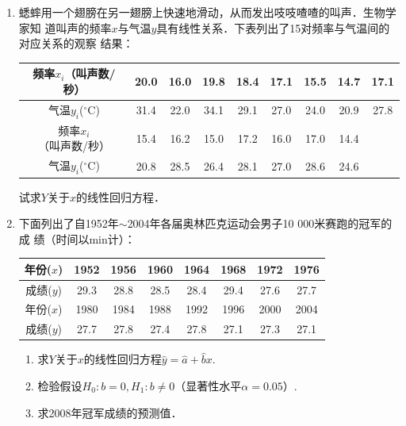 \begin{enumerate}
    \item 蟋蟀用一个翅膀在另一翅膀上快速地滑动，从而发出吱吱喳喳的叫声．生物学家知
    道叫声的频率$x$与气温$y$具有线性关系．下表列出了15对频率与气温间的对应关系的观察
    结果：
    \renewcommand{\arraystretch}{1.3}
    \begin{table}[H]\centering
        \begin{tabular}{c|cccccccc}
        \hline
        频率$x_i$（叫声数/秒） & 20.0 & 16.0 & 19.8 & 18.4 & 17.1 & 15.5 & 14.7 & 17.1 \\ \hline
        气温$y_i$($^{\circ}$C)     & 31.4 & 22.0 & 34.1 & 29.1 & 27.0 & 24.0 & 20.9 & 27.8 \\ \hline
        频率$x_i$（叫声数/秒） & 15.4 & 16.2 & 15.0 & 17.2 & 16.0 & 17.0 & 14.4 &      \\ \hline
        气温$y_i$($^{\circ}$C)     & 20.8 & 28.5 & 26.4 & 28.1 & 27.0 & 28.6 & 24.6 &      \\ \hline
        \end{tabular}
    \end{table}
    \renewcommand{\arraystretch}{1.0}
    试求$Y$关于$x$的线性回归方程．




    \item 下面列出了自1952年$\sim$2004年各届奥林匹克运动会男子10 000米赛跑的冠军的成
    绩（时间以min计）：
    \renewcommand{\arraystretch}{1.3}
    \begin{table}[H]\centering
        \begin{tabular}{c|ccccccc}
        \hline
        年份($x$) & 1952 & 1956 & 1960 & 1964 & 1968 & 1972 & 1976 \\ \hline
        成绩($y$) & 29.3 & 28.8 & 28.5 & 28.4 & 29.4 & 27.6 & 27.7 \\ \hline
        年份($x$) & 1980 & 1984 & 1988 & 1992 & 1996 & 2000 & 2004 \\ \hline
        成绩($y$) & 27.7 & 27.8 & 27.4 & 27.8 & 27.1 & 27.3 & 27.1 \\ \hline
        \end{tabular}
    \end{table}
    \renewcommand{\arraystretch}{1.0}
    \begin{enumerate}
        \item 求$Y$关于$x$的线性回归方程$\hat{y}=\hat{a}+\hat{b}x$.
        \item 检验假设$H_0:b=0,H_1:b\neq 0$（显著性水平$\alpha=0.05$）.
        \item 求2008年冠军成绩的预测值．
    \end{enumerate}




\end{enumerate}

